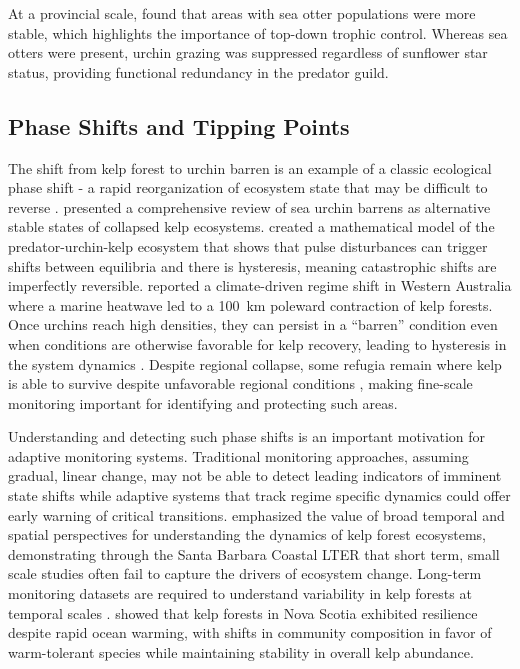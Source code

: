 \documentclass[12pt,oneside]{book}
\begin{document}
At a provincial scale, \citet{Starko2024} found that areas with sea otter populations were more stable, which highlights the importance of top-down trophic control. Whereas sea otters were present, urchin grazing was suppressed regardless of sunflower star status, providing functional redundancy in the predator guild.

\subsection{Phase Shifts and Tipping Points}
\label{subsec:phase-shifts}

The shift from kelp forest to urchin barren is an example of a classic ecological phase shift - a rapid reorganization of ecosystem state that may be difficult to reverse \citep{Holling1973, Steneck2002, Steneck2008, FilbeeDexter2018}. \citet{FilbeeDexter2014} presented a comprehensive review of sea urchin barrens as alternative stable states of collapsed kelp ecosystems. \citet{Wilman2021} created a mathematical model of the predator-urchin-kelp ecosystem that shows that pulse disturbances can trigger shifts between equilibria and there is hysteresis, meaning catastrophic shifts are imperfectly reversible. \citet{Wernberg2016} reported a climate-driven regime shift in Western Australia where a marine heatwave led to a 100~km poleward contraction of kelp forests. Once urchins reach high densities, they can persist in a ``barren'' condition even when conditions are otherwise favorable for kelp recovery, leading to hysteresis in the system dynamics \citep{Ling2015}. Despite regional collapse, some refugia remain where kelp is able to survive despite unfavorable regional conditions \citep{CavanaughKC2023}, making fine-scale monitoring important for identifying and protecting such areas.

Understanding and detecting such phase shifts is an important motivation for adaptive monitoring systems. Traditional monitoring approaches, assuming gradual, linear change, may not be able to detect leading indicators of imminent state shifts \citep{Reed2016} while adaptive systems that track regime specific dynamics could offer early warning of critical transitions. \citet{Reed2015} emphasized the value of broad temporal and spatial perspectives for understanding the dynamics of kelp forest ecosystems, demonstrating through the Santa Barbara Coastal LTER that short term, small scale studies often fail to capture the drivers of ecosystem change. Long-term monitoring datasets are required to understand variability in kelp forests at temporal scales \citep{Malone2022, Pfister2018}. \citet{Krumhansl2024} showed that kelp forests in Nova Scotia exhibited resilience despite rapid ocean warming, with shifts in community composition in favor of warm-tolerant species while maintaining stability in overall kelp abundance.
\end{document}
